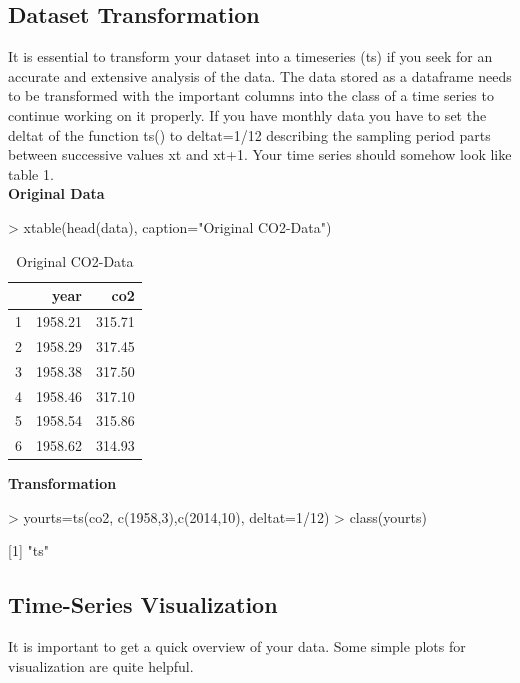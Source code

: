 \documentclass[11pt, a4paper]{article} %
\begin{document}
\subsection{Dataset Transformation}
It is essential to transform your dataset into a timeseries (ts) if you seek for an accurate and extensive analysis of the data.
\noindent The data stored as a dataframe needs to be transformed with the important columns into the class of a time series to continue working on it properly. If you have monthly data you have to set the deltat of the function ts() to deltat=1/12 describing the sampling period parts between successive values xt and xt+1. Your time series should somehow look like table 1.\\
\noindent \textbf{Original Data}\\
\begin{Schunk}
\begin{Sinput}
> xtable(head(data), caption="Original CO2-Data")
\end{Sinput}
\begin{table}[ht]
\centering
\begin{tabular}{rrr}
  \hline
 & year & co2 \\ 
  \hline
1 & 1958.21 & 315.71 \\ 
  2 & 1958.29 & 317.45 \\ 
  3 & 1958.38 & 317.50 \\ 
  4 & 1958.46 & 317.10 \\ 
  5 & 1958.54 & 315.86 \\ 
  6 & 1958.62 & 314.93 \\ 
   \hline
\end{tabular}
\caption{Original CO2-Data} 
\end{table}\end{Schunk}
\noindent \textbf{Transformation}\\
\begin{Schunk}
\begin{Sinput}
> yourts=ts(co2, c(1958,3),c(2014,10), deltat=1/12)
> class(yourts)
\end{Sinput}
[1] "ts"\end{Schunk}
\subsection{Time-Series Visualization}%
It is important to get a quick overview of your data. Some simple plots for visualization are quite helpful.
\end{document}
